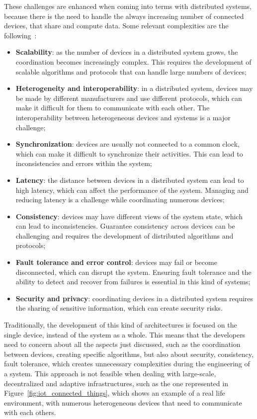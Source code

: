 These challenges are enhanced when coming into terms with distributed systems, because there is the need to handle the always increasing number of connected devices, that share and compute data.\newline
Some relevant complexities are the following~\cite{distributed_systems_challenges}:
\begin{itemize}
    \item \textbf{Scalability}: as the number of devices in a distributed system grows, the coordination becomes increasingly complex. This requires the development of scalable algorithms and protocols that can handle large numbers of devices;
    \item \textbf{Heterogeneity and interoperability}: in a distributed system, devices may be made by different manufacturers and use different protocols, which can make it difficult for them to communicate with each other. The interoperability between heterogeneous devices and systems is a major challenge;
    \item \textbf{Synchronization}: devices are usually not connected to a common clock, which can make it difficult to synchronize their activities. This can lead to inconsistencies and errors within the system;
    \item \textbf{Latency}: the distance between devices in a distributed system can lead to high latency, which can affect the performance of the system. Managing and reducing latency is a challenge while coordinating numerous devices;
    \item \textbf{Consistency}: devices may have different views of the system state, which can lead to inconsistencies. Guarantee consistency across devices can be challenging and requires the development of distributed algorithms and protocols;
    \item \textbf{Fault tolerance and error control}: devices may fail or become disconnected, which can disrupt the system. Ensuring fault tolerance and the ability to detect and recover from failures is essential in this kind of systems;
    \item \textbf{Security and privacy}: coordinating devices in a distributed system requires the sharing of sensitive information, which can create security risks.
\end{itemize}

Traditionally, the development of this kind of architectures is focused on the single device, instead of the system as a whole. This means that the developers need to concern about all the aspects just discussed, such as the coordination between devices, creating specific algorithms, but also about security, consistency, fault tolerance, which creates unnecessary complexities during the engineering of a system.\newline
This approach is not feasible when dealing with large-scale, decentralized and adaptive infrastructures, such as the one represented in Figure~\ref{fig:iot_connected_things}, which shows an example of a real life environment, with numerous heterogeneous devices that need to communicate with each others.

